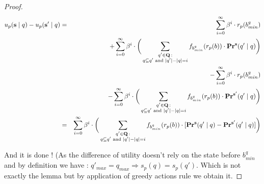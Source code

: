 \begin{proof}
\begin{eqnarray*}
	u_p(\mathbf{s} \mid q) - u_p(\mathbf{s}' \mid q)& = & \sum_{i=0}^{\infty}\beta^{i} \cdot  r_p(b^q_{min})  \\ 
	&&+ \sum_{i=0}^{\infty}\beta^{i} \cdot  \bigg(\sum_{\substack{q' \in \mathbf{Q} \,: \\ q \subseteq q' \text{ {\rm and} } |q'| - |q| = i}}  f_{b^q_{min}}(r_p(b)) \cdot 
	\mathbf{Pr}^{\mathbf{s}}(q' \mid q)\bigg) \\ 
	&& -  \sum_{i=0}^{\infty}\beta^{i} \cdot  r_p(b^q_{min})  \\ 
	&& - \sum_{i=0}^{\infty}\beta^{i} \cdot  \bigg(\sum_{\substack{q' \in \mathbf{Q} \,: \\ q \subseteq q' \text{ {\rm and} } |q'| - |q| = i}}  f_{b^q_{min}}(r_p(b)) \cdot 
	\mathbf{Pr}^{\mathbf{s}'}(q' \mid q)\bigg) \\ 	
	& = & \sum_{i=0}^{\infty}\beta^{i} \cdot  \bigg(\sum_{\substack{q' \in \mathbf{Q} \,: \\ q \subseteq q' \text{ {\rm and} } |q'| - |q| = i}} f_{b^q_{min}}(r_p(b)) \cdot 
	[\mathbf{Pr}^{\mathbf{s}}(q' \mid q)-\mathbf{Pr}^{\mathbf{s}'}(q' \mid q)]\bigg) \\
\end{eqnarray*}

And it is done ! (As the difference of utility doesn't rely on the state before $b^q_{min}$ and by definition we have : 
$q'_{max} = q_{max} \Rightarrow s_p(q) = s_p(q')$. Which is not exactly the lemma but by application of greedy actions rule we obtain it.
\fi
\end{proof}

\iffalse
\etienne{What i am currently working on : }
\begin{myprop}
	Let $\bs = (s_1,s_2)$ a $\beta$ discounted nash equilibrium then $\bs$ is greedy.
\end{myprop}
\begin{proof}
	Let $q$ a state. Let $L \in q$ a list. We denote by $\#(p1,L)$ the number of block own by $p1$ in $L$. Notice that  $\#(p1,L) + \#(p2,L) = |L|$.
	
	By absurd, let $q$ a state such that $s_1(q) = L$ and exists a state $q'$ such that $s_1(q)(q) \subseteq q'$ and $|s_1(q')| < |L|$.
	Let $q'$ one of the first, hence a element such that for all $q''$ , $q'' \subseteq q'$ implies that $s_1(q'') \geq |L|$ .
	
	Hence we have that $\#(p_1, L' \cap q) = \#(p_1, L')$
	\begin{itemize}
		\item suppose that $\#(p_1, L') \geq \#(p_1, L)$ 
		\item suppose that $\#(p_1, L') > \#(p_1, L)$ 
			Then $\#(p_2, L') \leq \#(p_2, L)$
		So $p_2$ will not mine on it, and i exclude it too (next step of the proof)
	\end{itemize}

	\begin{mylem}
		Let $s_1,s_2$ a pair of strategy.
		Let $q$ a state such that $s_1(q) = L$ and exists $L' \in q$ such that $\#(p_1, L') \geq \#(p_1, L)$ and $|L'| \geq |L|$ then exists $s$ such that $u_1((s,s_2),q_0) > u_1((s_1,s_2),q_0)$
	\end{mylem}
\end{proof}
\fi




